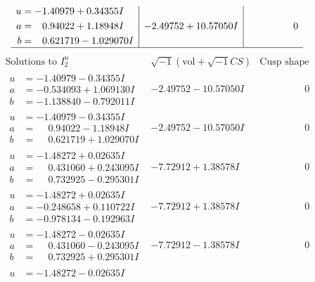 \documentclass[1p]{elsarticle_modified}
\theoremstyle{definition}
\newcommand{\I}{\sqrt{-1}}
\begin{document}
$$\begin{array}{c|c|c}
\begin{aligned}
u &= -1.40979 + 0.34355 I \\
a &= \phantom{-}0.94022 + 1.18948 I \\
b &= \phantom{-}0.621719 - 1.029070 I\end{aligned}
 & -2.49752 + 10.57050 I & \phantom{-0.000000 } 0\\
 \hline 
 \end{array}$$\newpage$$\begin{array}{c|c|c}  
\text{Solutions to }I^u_{2}& \I (\text{vol} + \sqrt{-1}CS) & \text{Cusp shape}\\
 \hline 
\begin{aligned}
u &= -1.40979 - 0.34355 I \\
a &= -0.534093 + 1.069130 I \\
b &= -1.138840 - 0.792011 I\end{aligned}
 & -2.49752 - 10.57050 I & \phantom{-0.000000 } 0 \\ \hline\begin{aligned}
u &= -1.40979 - 0.34355 I \\
a &= \phantom{-}0.94022 - 1.18948 I \\
b &= \phantom{-}0.621719 + 1.029070 I\end{aligned}
 & -2.49752 - 10.57050 I & \phantom{-0.000000 } 0 \\ \hline\begin{aligned}
u &= -1.48272 + 0.02635 I \\
a &= \phantom{-}0.431060 + 0.243095 I \\
b &= \phantom{-}0.732925 - 0.295301 I\end{aligned}
 & -7.72912 + 1.38578 I & \phantom{-0.000000 } 0 \\ \hline\begin{aligned}
u &= -1.48272 + 0.02635 I \\
a &= -0.248658 + 0.110722 I \\
b &= -0.978134 - 0.192963 I\end{aligned}
 & -7.72912 + 1.38578 I & \phantom{-0.000000 } 0 \\ \hline\begin{aligned}
u &= -1.48272 - 0.02635 I \\
a &= \phantom{-}0.431060 - 0.243095 I \\
b &= \phantom{-}0.732925 + 0.295301 I\end{aligned}
 & -7.72912 - 1.38578 I & \phantom{-0.000000 } 0 \\ \hline\begin{aligned}
u &= -1.48272 - 0.02635 I \\

\end{aligned}
\end{array}$$
\end{document}
